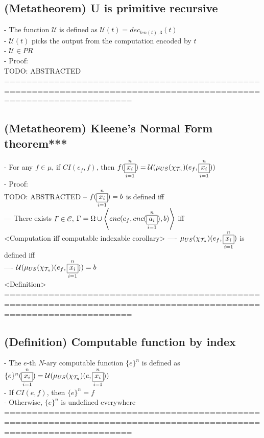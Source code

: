 \documentclass{book}
\newcommand{\seq}[1]{\left\langle #1 \right\rangle}
\newcommand{\vdc}[3]{\underset{#2}{\overset{#3}{\fbox{$#1$}}}}
\begin{document}
\subsection{(Metatheorem) U is primitive recursive} %
	- The function $\mathcal{U}$ is defined as $\mathcal{U}(t) = dec_{len(t), 3}(t)$ \\
	- $\mathcal{U}(t)$ picks the output from the computation encoded by $t$ \\
	- $\mathcal{U} \in PR$ \\
	- Proof: \\ TODO: ABSTRACTED
	===================================================================================================================
\subsection{(Metatheorem) Kleene's Normal Form theorem***} %
	- For any $f \in \mu$, if $CI(e_f, f)$, then $f(\vdc{x_i}{i=1}{n}) = \mathcal{U}(\mu_{US}(\chi_{\mathcal{T}_n})(e_f, \vdc{x_i}{i=1}{n}))$ \\
	- Proof: \\ TODO: ABSTRACTED
		-- $f(\vdc{x_i}{i=1}{n}) = b$ is defined iff \\
			--- There exists $\Gamma \in \mathcal{C}$, $\Gamma = \Omega \cup \seq{enc(e_f, enc(\vdc{a_i}{i=1}{n}), b)}$ iff \\ <Computation iff computable indexable corollary>
			---- $\mu_{US}(\chi_{\mathcal{T}_n})(e_f, \vdc{x_i}{i=1}{n})$ is defined iff \\
			---- $\mathcal{U}(\mu_{US}(\chi_{\mathcal{T}_n})(e_f, \vdc{x_i}{i=1}{n})) = b$ \\ <Definition>
	===================================================================================================================
\subsection{(Definition) Computable function by index} %
	- The $e$-th $N$-ary computable function $\{e\}^n$ is defined as $\{e\}^n(\vdc{x_i}{i=1}{n}) = \mathcal{U}(\mu_{US}(\chi_{\mathcal{T}_n})(e, \vdc{x_i}{i=1}{n}))$ \\
	- If $CI(e, f)$, then $\{e\}^n = f$ \\
	- Otherwise, $\{e\}^n$ is undefined everywhere \\
	===================================================================================================================
\end{document}
